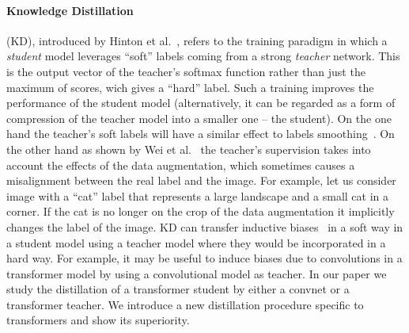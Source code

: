 \paragraph{Knowledge Distillation} (KD), introduced by Hinton et al.~\cite{Hinton2015DistillingTK}, refers to the training paradigm in which a \emph{student} model leverages ``soft'' labels coming from a strong \emph{teacher} network. 
This is the output vector of the teacher's softmax function rather than just the maximum of scores, wich gives a ``hard'' label.
Such a training improves the performance of the student model (alternatively, it can be regarded as a form of compression of the teacher model into a smaller one -- the student).
On the one hand the teacher's soft labels will have a similar effect to labels smoothing~\cite{Yuan2019RevisitKD}. %
On the other hand as shown by Wei et al.~\cite{Wei2020CircumventingOO} the teacher's supervision takes into account the effects of the data augmentation, which sometimes causes a misalignment between the real label and the image.
For example, let us consider image with a ``cat'' label that represents a large landscape and a small cat in a corner. 
If the cat is no longer on the crop of the data augmentation it implicitly changes the label of the image. 
KD can transfer inductive biases~\cite{abnar2020transferring}  in a soft way in a student model using a teacher model where they would be incorporated in a hard way. 
For example, it may be useful to induce biases due to convolutions in a transformer model by using a convolutional model as teacher. 
In our paper we study the distillation of a transformer student by either a convnet or a transformer teacher. We introduce a new distillation procedure specific to transformers and show its superiority. 
